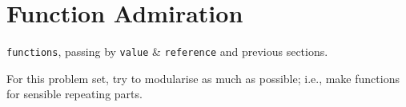 \documentclass[../../Problems]{subfiles}
\begin{document}
\section{Function Admiration}
\begin{topics}
\verb!functions!, passing by \verb!value! \& \verb!reference! and previous sections.
\end{topics}
For this problem set, try to modularise as much as possible; i.e., make functions for sensible repeating parts.





\end{document}
